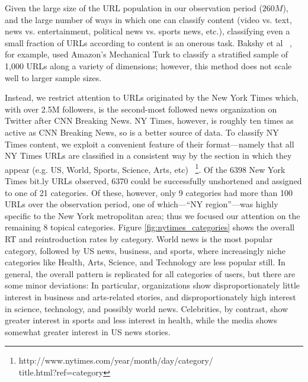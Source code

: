 \documentclass[phd,tocprelim]{cornell}
\begin{document}
Given the large size of the URL population in our observation period
($260M$), and the large number of ways in which one can classify content
(video vs. text, news vs. entertainment, political news vs. sports news,
etc.), classifying even a small fraction of URLs according to content is an
onerous task. Bakshy et al ~\cite{Bakshy-2011}, for example, used Amazon's
Mechanical Turk to classify a stratified sample of 1,000 URLs along a
variety of dimensions; however, this method does not scale well to larger
sample sizes.

Instead, we restrict attention to URLs originated by the New York Times
which, with over 2.5M followers, is the second-most followed news
organization on Twitter after CNN Breaking News. NY Times, however, is
roughly ten times as active as CNN Breaking News, so is a better source of
data. To classify NY Times content, we exploit a convenient feature of
their format---namely that all NY Times URLs are classified in a consistent
way by the section in which they appear (e.g. US, World, Sports, Science,
Arts, etc)
~\footnote{http://www.nytimes.com/year/month/day/category/\\title.html?ref=category}.
Of the 6398 New York Times bit.ly URLs observed, 6370 could be successfully
unshortened and assigned to one of 21 categories. Of these, however, only 9
categories had more than 100 URLs over the observation period, one of
which---``NY region''---was highly specific to the New York metropolitan
area; thus we focused our attention on the remaining 8 topical categories.
Figure \ref{fig:nytimes_categories} shows the overall RT and reintroduction
rates by category. World news is the most popular category, followed by US
news, business, and sports, where increasingly niche categories like
Health, Arts, Science, and Technology are less popular still.  In general,
the overall pattern is replicated for all categories of users, but there
are some minor deviations: In particular, organizations show
disproportionately little interest in business and arts-related stories,
and disproportionately high interest in science, technology, and possibly
world news. Celebrities, by contrast, show greater interest in sports and
less interest in health, while the media shows somewhat greater interest in
US news stories.

\end{document}

